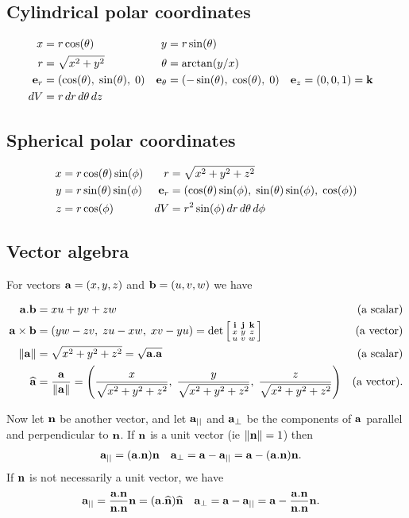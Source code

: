 \documentclass{amsart}
\begin{document}
\subsection*{Cylindrical polar coordinates}

\begin{align*}
 x &= r\cos(\theta) & y &= r\sin(\theta) \\
 r &= \sqrt{x^2+y^2} & \theta &= \arctan(y/x) \\
 \mathbf{e}_r &= (\cos(\theta),\;\sin(\theta),\;0) &
 \mathbf{e}_\theta &= (-\sin(\theta),\;\cos(\theta),\;0) & 
 \mathbf{e}_z &= (0,0,1)=\mathbf{k} \\
 dV &= r\,dr\,d\theta\,dz
\end{align*}

\subsection*{Spherical polar coordinates}

\begin{align*}
 x &= r\cos(\theta)\sin(\phi) &
   r &= \sqrt{x^2+y^2+z^2} \\
 y &= r\sin(\theta)\sin(\phi) &
   \mathbf{e}_r &= (\cos(\theta)\sin(\phi),\;\sin(\theta)\sin(\phi),\;\cos(\phi)) \\
 z &= r\cos(\phi) &
  dV &= r^2\sin(\phi)\,dr\,d\theta\,d\phi
\end{align*}

\subsection*{Vector algebra}

For vectors $\mathbf{a}=(x,y,z)$ and $\mathbf{b}=(u,v,w)$ we have

\begin{align*}
 \mathbf{a} . \mathbf{b} &= xu+yv+zw & \text{(a scalar)} \\
 \mathbf{a}\times\mathbf{b} &= (yw-zv,\;zu-xw,\;xv-yu) 
  = \det\left[\begin{smallmatrix} \mathbf{i} & \mathbf{j} & \mathbf{k} \\ x & y & z \\ u & v & w \end{smallmatrix}\right] 
   & \text{(a vector)} \\
 \|\mathbf{a}\| &= \sqrt{x^2+y^2+z^2} = \sqrt{\mathbf{a}.\mathbf{a}} 
   & \text{(a scalar)} \\
 \widehat{\mathbf{a}} &= \frac{\mathbf{a}}{\|\mathbf{a}\|} 
    = \left(\frac{x}{\sqrt{x^2+y^2+z^2}},\;
            \frac{y}{\sqrt{x^2+y^2+z^2}},\;
            \frac{z}{\sqrt{x^2+y^2+z^2}}\right) 
   & \text{(a vector)}.
\end{align*}

Now let $\mathbf{n}$ be another vector, and let $\mathbf{a}_{||}$ and $\mathbf{a}_\perp$ be
the components of $\mathbf{a}$ parallel and perpendicular to $\mathbf{n}$.  If $\mathbf{n}$
is a unit vector (ie $\|\mathbf{n}\|=1$) then
\begin{align*}
 \mathbf{a}_{||} &= (\mathbf{a}.\mathbf{n})\mathbf{n} &
 \mathbf{a}_\perp &= \mathbf{a}-\mathbf{a}_{||} = \mathbf{a} - (\mathbf{a}.\mathbf{n})\mathbf{n}.
\end{align*}
If $\mathbf{n}$ is not necessarily a unit vector, we have
\begin{align*}
 \mathbf{a}_{||} &= \frac{\mathbf{a}.\mathbf{n}}{\mathbf{n}.\mathbf{n}}\mathbf{n} = (\mathbf{a}.\widehat{\mathbf{n}})\widehat{\mathbf{n}} &
 \mathbf{a}_\perp &= \mathbf{a}-\mathbf{a}_{||} = \mathbf{a} - \frac{\mathbf{a}.\mathbf{n}}{\mathbf{n}.\mathbf{n}}\mathbf{n}.
\end{align*}
\end{document}
